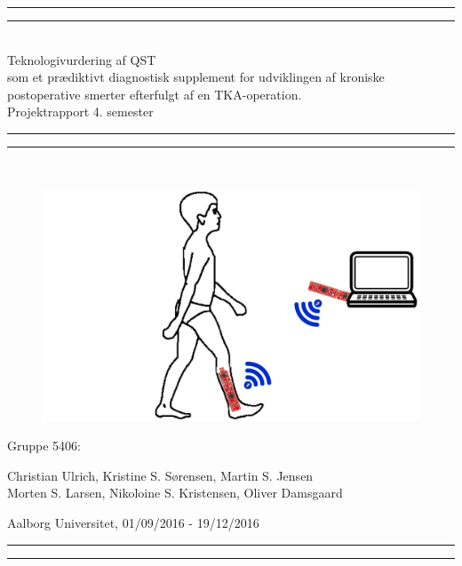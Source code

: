 \clearpage
\thispagestyle{empty}

\begin{center}
	\vspace*{\baselineskip}
	\rule{\textwidth}{1.6pt}\vspace*{-\baselineskip}\vspace*{2pt} %
	\rule{\textwidth}{0.4pt}\\[\baselineskip] %
	
	{\huge Teknologivurdering af QST \\\hspace*{2ex} som et prædiktivt diagnostisk supplement for udviklingen af kroniske postoperative smerter efterfulgt af en TKA-operation.\\[0.5\baselineskip] \large Projektrapport 4. semester}\\[0.2\baselineskip] %
	
	\rule{\textwidth}{0.4pt}\vspace*{-\baselineskip}\vspace{3.2pt} %
	\rule{\textwidth}{1.6pt}\\[\baselineskip] %
	\vspace*{5\baselineskip}
	\begin{figure}[H]
		\centering
		\begin{minipage}[c]{1\textwidth}
			\includegraphics[width=.65\textwidth]{figures/forside2.PNG}
		\end{minipage}
		\hfill
	\end{figure}
	\vspace*{\fill}
	\scshape %
	{\Large Gruppe 5406:\par}
	Christian Ulrich, Kristine S. Sørensen, Martin S. Jensen \\
	Morten S. Larsen, Nikoloine S. Kristensen, Oliver Damsgaard
	
	\vspace*{.2\baselineskip} %
	Aalborg Universitet,  01/09/2016 - 19/12/2016 \par %
\end{center} %
\begin{center}
	\rule{\textwidth}{0.4pt}\vspace*{-\baselineskip}\vspace{3.2pt} %
	\rule{\textwidth}{1.6pt}\\[\baselineskip] %
\end{center}